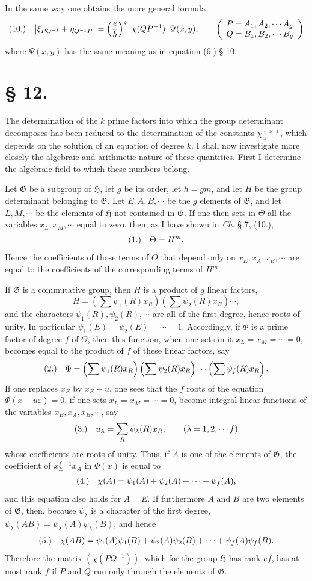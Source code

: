 \documentclass[11pt]{article}
\makeatletter
\newcommand{\Hgrp}{\mathfrak{H}}
\newcommand{\Ggrp}{\mathfrak{G}}
\newcommand{\frobtag}[2]{\[\begin{array}{@{}r@{\quad}l@{}}\textup{(#1)} & \displaystyle #2\end{array}\]}
\newcommand{\frobtagc}[2]{\[\begin{array}{@{}r@{\quad}c@{}}\textup{(#1)} & \displaystyle #2\end{array}\]}
\makeatother
\begin{document}
In the same way one obtains the more general formula
\frobtag{10.}{\left|\xi_{PQ^{-1}}+\eta_{Q^{-1}P}\right|=\left(\frac{e}{h}\right)^g\left|\chi(QP^{-1})\right|\Psi(x,y),\qquad \left(\begin{array}{l}P=A_1,A_2,\cdots A_g\\ Q=B_1,B_2,\cdots B_g\end{array}\right)}
where $\Psi(x,y)$ has the same meaning as in equation (6.) § 10.

\section*{§ 12.}

The determination of the $k$ prime factors into which the group determinant decomposes has been reduced to the determination of the constants $\chi_\alpha^{(\varkappa)}$, which depends on the solution of an equation of degree $k$. I shall now investigate more closely the algebraic and arithmetic nature of these quantities. First I determine the algebraic field to which these numbers belong.

Let $\Ggrp$ be a subgroup of $\Hgrp$, let $g$ be its order, let $h=gm$, and let $H$ be the group determinant belonging to $\Ggrp$. Let $E,A,B,\cdots$ be the $g$ elements of $\Ggrp$, and let $L,M,\cdots$ be the elements of $\Hgrp$ not contained in $\Ggrp$. If one then sets in $\Theta$ all the variables $x_L,x_M,\cdots$ equal to zero, then, as I have shown in \emph{Ch.} § 7, (10.),
\frobtagc{1.}{\Theta=H^m.}
Hence the coefficients of those terms of $\Theta$ that depend only on $x_E,x_A,x_B,\cdots$ are equal to the coefficients of the corresponding terms of $H^m$.

If $\Ggrp$ is a commutative group, then $H$ is a product of $g$ linear factors,
\[
H=\left(\sum\psi_1(R)x_R\right)\left(\sum\psi_2(R)x_R\right)\cdots,
\]
and the characters $\psi_1(R),\psi_2(R),\cdots$ are all of the first degree, hence roots of unity. In particular $\psi_1(E)=\psi_2(E)=\cdots=1$. Accordingly, if $\Phi$ is a prime factor of degree $f$ of $\Theta$, then this function, when one sets in it $x_L=x_M=\cdots=0$, becomes equal to the product of $f$ of these linear factors, say
\frobtagc{2.}{\Phi=\left(\sum\psi_1(R)x_R\right)\left(\sum\psi_2(R)x_R\right)\cdots\left(\sum\psi_f(R)x_R\right).}
If one replaces $x_E$ by $x_E-u$, one sees that the $f$ roots of the equation $\Phi(x-u\varepsilon)=0$, if one sets $x_L=x_M=\cdots=0$, become integral linear functions of the variables $x_E,x_A,x_B,\cdots$, say
\frobtagc{3.}{u_\lambda=\sum_R\psi_\lambda(R)x_R,\qquad (\lambda=1,2,\cdots f)}
whose coefficients are roots of unity. Thus, if $A$ is one of the elements of $\Ggrp$, the coefficient of $x_E^{f-1}x_A$ in $\Phi(x)$ is equal to
\frobtagc{4.}{\chi(A)=\psi_1(A)+\psi_2(A)+\cdots+\psi_f(A),}
and this equation also holds for $A=E$. If furthermore $A$ and $B$ are two elements of $\Ggrp$, then, because $\psi_\lambda$ is a character of the first degree, $\psi_\lambda(AB)=\psi_\lambda(A)\psi_\lambda(B)$, and hence
\frobtagc{5.}{\chi(AB)=\psi_1(A)\psi_1(B)+\psi_2(A)\psi_2(B)+\cdots+\psi_f(A)\psi_f(B).}
Therefore the matrix $(\chi(PQ^{-1}))$, which for the group $\Hgrp$ has rank $ef$, has at most rank $f$ if $P$ and $Q$ run only through the elements of $\Ggrp$.
\end{document}

